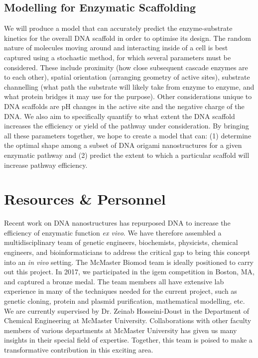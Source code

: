 \documentclass[a4paper]{article}
\begin{document}
\subsection*{Modelling for Enzymatic Scaffolding}
We will produce a model that can accurately predict the enzyme-substrate kinetics for the overall DNA scaffold in order to optimise its design.
The random nature of  molecules moving around and interacting inside of a cell is best captured using a stochastic method, for which several parameters must be considered\cite{meth5,meth6,meth7}.
These include proximity (how close subsequent cascade enzymes are to each other), spatial orientation (arranging geometry of active sites), substrate channelling (what path the substrate will likely take from enzyme to enzyme, and what protein bridges it may use for the purpose)\cite{meth5,meth6}.
Other considerations unique to DNA scaffolds are pH changes in the active site and the negative charge of the DNA\cite{meth7}.
We also aim to specifically quantify to what extent the DNA scaffold increases the efficiency or yield of the pathway under consideration.
By bringing all these parameters together, we hope to create a model that can: (1) determine the optimal shape among a subset of DNA origami nanostructures for a given enzymatic pathway and (2) predict the extent to which a particular scaffold will increase pathway efficiency.
\section*{Resources \& Personnel}
Recent work on DNA nanostructures has repurposed DNA to increase the efficiency of enzymatic function \textit{ex vivo}.
We have therefore assembled a multidisciplinary team of genetic engineers, biochemists, physicists, chemical engineers, and bioinformaticians to address the critical gap to bring this concept into an \textit{in vivo} setting.
The McMaster Biomod team is ideally positioned to carry out this project.
In 2017, we participated in the \ac{igem} competition in Boston, MA, and captured a bronze medal.
The team members all have extensive lab experience in many of the techniques needed for the current project, such as genetic cloning, protein and plasmid purification, mathematical modelling, etc.
We are currently supervised by Dr. Zeinab Hosseini-Doust in the Department of Chemical Engineering at McMaster University.
Collaborations with other faculty members of various departments at McMaster University has given us many insights in their special field of expertise.
Together, this team is poised to make a transformative contribution in this exciting area.
\end{document}
